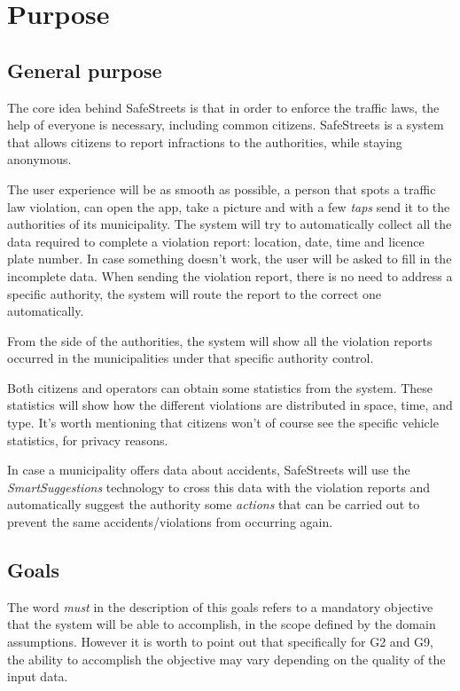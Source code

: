 \section{Purpose}
\subsection{General purpose}
The core idea behind SafeStreets is that in order to enforce the traffic laws,
the help of everyone is necessary, including common citizens.
SafeStreets is a system that allows citizens to report infractions to the
authorities, while staying anonymous.

The user experience will be as smooth as possible, a person that spots a
traffic law violation, can open the app, take a picture and with a few
\emph{taps} send it to the authorities of its municipality.
The system will try to automatically collect all the data required to complete
a violation report: location, date, time and licence plate number. In case
something doesn't work, the user will be asked to fill in the incomplete data.
When sending the violation report, there is no need to address a specific
authority, the system will route the report to the correct one automatically.

From the side of the authorities, the system will show all the violation reports
occurred in the municipalities under that specific authority control.

Both citizens and operators can obtain some statistics from the system. These
statistics will show how the different violations are distributed in space, time,
and type. It's worth mentioning that citizens won't of course see the specific
vehicle statistics, for privacy reasons.

In case a municipality offers data about accidents, SafeStreets will use the
\emph{SmartSuggestions} technology to cross this data with the violation 
reports and automatically suggest the authority some \emph{actions} that can be
carried out to prevent the same accidents/violations from occurring again.

\subsection{Goals}

\begin{description}
\end{description}

\noindent
The word \emph{must} in the description of this goals refers to a mandatory
objective that the system will be able to accomplish, in the scope defined
by the domain assumptions.
However it is worth to point out that specifically for G2 and G9,
the ability to accomplish the objective may vary depending on the
quality of the input data.